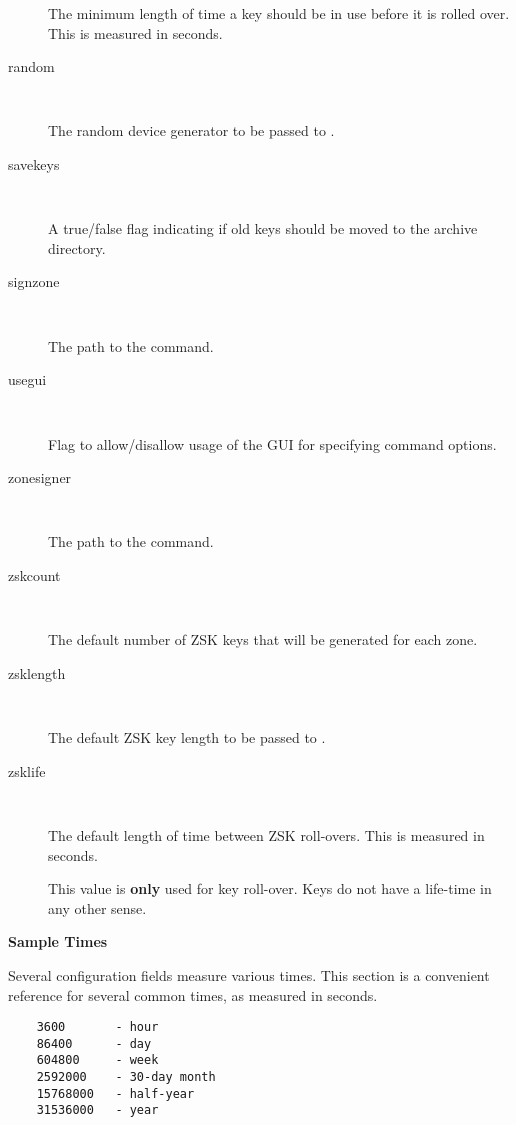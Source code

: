 \begin{description}
The minimum length of time a key should be in use before it is rolled over.
This is measured in seconds.

\item [random]\verb" "

The random device generator to be passed to .

\item [savekeys]\verb" "

A true/false flag indicating if old keys should be moved to the
archive directory.

\item [signzone]\verb" "

The path to the  command.

\item [usegui]\verb" "

Flag to allow/disallow usage of the GUI for specifying command options.

\item [zonesigner]\verb" "

The path to the  command.

\item [zskcount]\verb" "

The default number of ZSK keys that will be generated for each zone.

\item [zsklength]\verb" "

The default ZSK key length to be passed to .

\item [zsklife]\verb" "

The default length of time between ZSK roll-overs.  This is measured in
seconds.

This value is {\bf only} used for key roll-over.  Keys do not have a life-time
in any other sense.

\end{description}

{\bf Sample Times}

Several configuration fields measure various times.  This section is a
convenient reference for several common times, as measured in seconds.

\begin{verbatim}
    3600       - hour
    86400      - day
    604800     - week
    2592000    - 30-day month
    15768000   - half-year
    31536000   - year
\end{verbatim}

